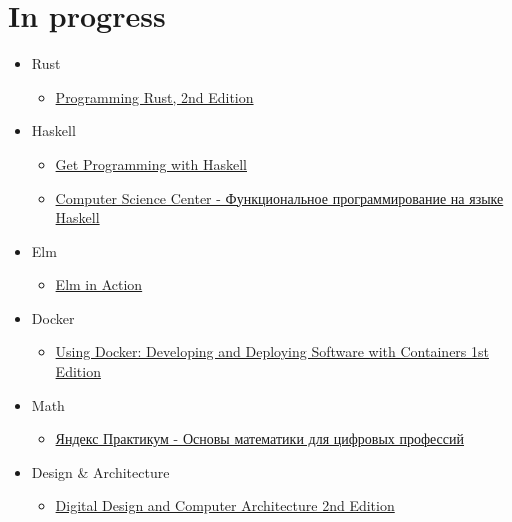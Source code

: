 \documentclass{article}
\begin{document}
\section{In progress}
\label{In progress}
\label{in-progress}
\begin{itemize}
\item Rust\begin{itemize}
\item \href{https://www.oreilly.com/library/view/programming-rust-2nd/9781492052586/}{Programming Rust, 2nd Edition}
\end{itemize}

\item Haskell\begin{itemize}
\item \href{https://www.manning.com/books/get-programming-with-haskell?query=Get%20Programming%20with%20Haskell}{Get Programming with Haskell}
\item \href{https://stepik.org/course/75/info}{Computer Science Center - Функциональное программирование на языке Haskell}
\end{itemize}

\item Elm\begin{itemize}
\item \href{https://www.manning.com/books/elm-in-action?query=Elm%20in%20Action}{Elm in Action}
\end{itemize}

\item Docker\begin{itemize}
\item \href{https://www.amazon.com/Using-Docker-Developing-Deploying-Containers/dp/1491915765}{Using Docker: Developing and Deploying Software with Containers 1st Edition}
\end{itemize}

\item Math\begin{itemize}
\item \href{https://practicum.yandex.ru/math-foundations/}{Яндекс Практикум - Основы математики для цифровых профессий}
\end{itemize}

\item Design \& Architecture\begin{itemize}
\item \href{https://www.amazon.com/Digital-Design-Computer-Architecture-Harris/dp/0123944244}{Digital Design and Computer Architecture 2nd Edition}
\end{itemize}


\end{itemize}
\end{document}
